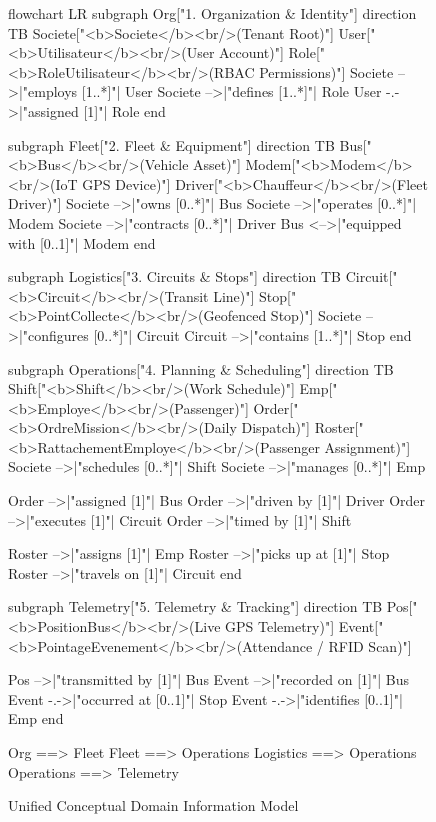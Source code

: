 \begin{figure}[p]
  \centering
  \begin{mermaid}[width=1.35\linewidth]
flowchart LR
    subgraph Org["1. Organization & Identity"]
        direction TB
        Societe["<b>Societe</b><br/>(Tenant Root)"]
        User["<b>Utilisateur</b><br/>(User Account)"]
        Role["<b>RoleUtilisateur</b><br/>(RBAC Permissions)"]
        Societe -->|"employs [1..*]"| User
        Societe -->|"defines [1..*]"| Role
        User -.->|"assigned [1]"| Role
    end

    subgraph Fleet["2. Fleet & Equipment"]
        direction TB
        Bus["<b>Bus</b><br/>(Vehicle Asset)"]
        Modem["<b>Modem</b><br/>(IoT GPS Device)"]
        Driver["<b>Chauffeur</b><br/>(Fleet Driver)"]
        Societe -->|"owns [0..*]"| Bus
        Societe -->|"operates [0..*]"| Modem
        Societe -->|"contracts [0..*]"| Driver
        Bus <-->|"equipped with [0..1]"| Modem
    end

    subgraph Logistics["3. Circuits & Stops"]
        direction TB
        Circuit["<b>Circuit</b><br/>(Transit Line)"]
        Stop["<b>PointCollecte</b><br/>(Geofenced Stop)"]
        Societe -->|"configures [0..*]"| Circuit
        Circuit -->|"contains [1..*]"| Stop
    end

    subgraph Operations["4. Planning & Scheduling"]
        direction TB
        Shift["<b>Shift</b><br/>(Work Schedule)"]
        Emp["<b>Employe</b><br/>(Passenger)"]
        Order["<b>OrdreMission</b><br/>(Daily Dispatch)"]
        Roster["<b>RattachementEmploye</b><br/>(Passenger Assignment)"]
        Societe -->|"schedules [0..*]"| Shift
        Societe -->|"manages [0..*]"| Emp
        
        Order -->|"assigned [1]"| Bus
        Order -->|"driven by [1]"| Driver
        Order -->|"executes [1]"| Circuit
        Order -->|"timed by [1]"| Shift
        
        Roster -->|"assigns [1]"| Emp
        Roster -->|"picks up at [1]"| Stop
        Roster -->|"travels on [1]"| Circuit
    end

    subgraph Telemetry["5. Telemetry & Tracking"]
        direction TB
        Pos["<b>PositionBus</b><br/>(Live GPS Telemetry)"]
        Event["<b>PointageEvenement</b><br/>(Attendance / RFID Scan)"]
        
        Pos -->|"transmitted by [1]"| Bus
        Event -->|"recorded on [1]"| Bus
        Event -.->|"occurred at [0..1]"| Stop
        Event -.->|"identifies [0..1]"| Emp
    end

    Org ==> Fleet
    Fleet ==> Operations
    Logistics ==> Operations
    Operations ==> Telemetry
  \end{mermaid}
  \caption{Unified Conceptual Domain Information Model}
  \label{fig:conceptual_domain_model}
\end{figure}

